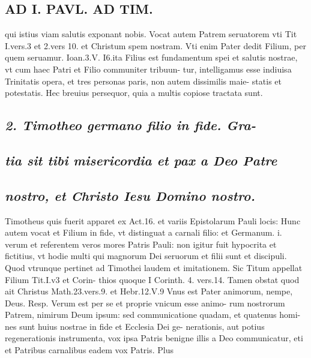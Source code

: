 \documentclass{article}
\begin{document}
\begin{pages}
\section*{AD I. PAVL. AD TIM. }
\marginpar{[ p.4 ]}qui istius viam salutis exponant nobis. Vocat autem Patrem seruatorem vti Tit I.vers.3 et 2.vers 10. et Christum spem nostram. Vti enim Pater dedit Filium, per quem seruamur. Ioan.3.V. I6.ita Filius est fundamentum spei et salutis nostrae, vt cum haec Patri et Filio communiter tribuun- tur, intelligamus esse indiuisa Trinitatis opera, et tres personas paris, non autem dissimilis maie- statis et potestatis. Hec breuius persequor, quia a multis copiose tractata sunt. 
{}
\subsection*{\textit{2. Timotheo germano filio in fide. Gra-}} 
{}
\subsection*{\textit{tia sit tibi misericordia et pax a Deo Patre}} 
{}
\subsection*{\textit{nostro, et Christo Iesu Domino nostro.}} Timotheus quis fuerit apparet ex Act.16. et variis Epistolarum Pauli locis: Hunc autem vocat et Filium in fide, vt distinguat a carnali filio: et Germanum. i. verum et referentem veros mores Patris Pauli: non igitur fuit hypocrita et fictitius, vt hodie multi qui magnorum Dei seruorum et filii sunt et discipuli. Quod vtrunque pertinet ad Timothei laudem et imitationem. Sic Titum appellat Filium Tit.I.v3 et Corin- thios quoque I Corinth. 4. vers.14. Tamen obstat quod ait Christus Math.23.vers.9. et Hebr.12.V.9 Vnus est Pater animorum, nempe, Deus. Resp. Verum est per se et proprie vnicum esse animo- rum nostrorum Patrem, nimirum Deum ipsum: sed communicatione quadam, et quatenus homi- nes sunt huius nostrae in fide et Ecclesia Dei ge- nerationis, aut potius regenerationis instrumenta, vox ipsa Patris benigne illis a Deo communicatur, eti et Patribus carnalibus eadem vox Patris. Plus 

\end{pages}
\end{document}
